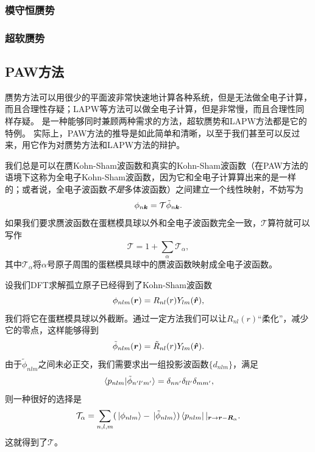 \subsubsection{模守恒赝势}

\subsubsection{超软赝势}



\subsection{PAW方法}\label{sec:dft-paw}

赝势方法可以用很少的平面波非常快速地计算各种系统，但是无法做全电子计算，而且合理性存疑；LAPW等方法可以做全电子计算，但是非常慢，而且合理性同样存疑。
是一种能够同时兼顾两种需求的方法，超软赝势和LAPW方法都是它的特例。
实际上，PAW方法的推导是如此简单和清晰，以至于我们甚至可以反过来，用它作为对赝势方法和LAPW方法的辩护。

我们总是可以在赝Kohn-Sham波函数和真实的Kohn-Sham波函数（在PAW方法的语境下这称为全电子Kohn-Sham波函数，因为它和全电子计算算出来的是一样的；或者说，全电子波函数\emph{不是}多体波函数）之间建立一个线性映射，不妨写为
\begin{equation}
    \phi_{n \vb*{k}} = \mathcal{T} \tilde{\phi}_{n \vb*{k}}.
\end{equation}
如果我们要求赝波函数在蛋糕模具球以外和全电子波函数完全一致，$\mathcal{T}$算符就可以写作
\begin{equation}
    \mathcal{T} = 1 + \sum_{\alpha} \mathcal{T}_\alpha,
\end{equation}
其中$\mathcal{T}_\alpha$将$\alpha$号原子周围的蛋糕模具球中的赝波函数映射成全电子波函数。

设我们DFT求解孤立原子已经得到了Kohn-Sham波函数
\begin{equation}
    \phi_{nlm}(\vb*{r}) = R_{nl}(r) Y_{lm}(\vu*{r}),
\end{equation}
我们将它在蛋糕模具球以外截断。通过一定方法我们可以让$R_{nl}(r)$“柔化”，减少它的零点，这样能够得到
\begin{equation}
    \tilde{\phi}_{nlm}(\vb*{r}) = \tilde{R}_{nl}(r) Y_{lm}(\vu*{r}).
\end{equation}
由于$\tilde{\phi}_{nlm}$之间未必正交，我们需要求出一组投影波函数$\{d_{nlm}\}$，满足
\begin{equation}
    \braket*{p_{nlm}}{\tilde{\phi}_{n' l' m'}} = \delta_{n n'} \delta_{l l'} \delta_{m m'},
\end{equation}
则一种很好的选择是
\begin{equation}
    \mathcal{T}_\alpha = \sum_{n, l, m} (\ket*{\phi_{nlm}} - \ket*{\tilde{\phi}_{nlm}}) \bra{p_{nlm}} |_{\vb*{r} \to \vb*{r} - \vb*{R}_\alpha}.
\end{equation}
这就得到了$\mathcal{T}$。

